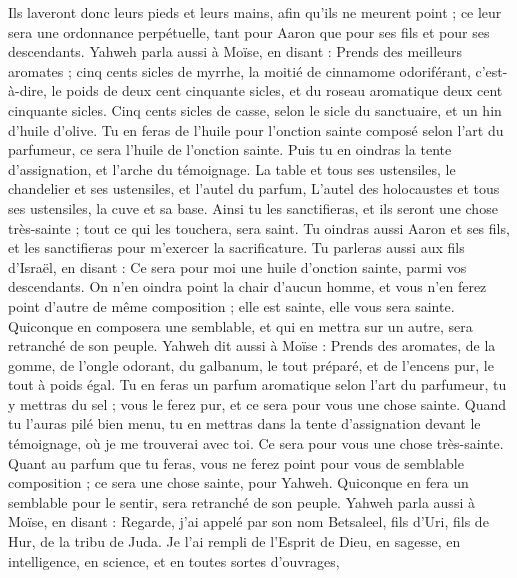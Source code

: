 \begin{multicols}{2}
Ils laveront donc leurs pieds et leurs mains, afin qu'ils ne meurent point ; ce leur sera une ordonnance perpétuelle, tant pour Aaron que pour ses fils et pour ses descendants.
Yahweh parla aussi à Moïse, en disant :
Prends des meilleurs aromates ; cinq cents sicles de myrrhe, la moitié de cinnamome odoriférant, c'est-à-dire, le poids de deux cent cinquante sicles, et du roseau aromatique deux cent cinquante sicles.
Cinq cents sicles de casse, selon le sicle du sanctuaire, et un hin d'huile d'olive.
Tu en feras de l'huile pour l'onction sainte composé selon l’art du parfumeur, ce sera l'huile de l'onction sainte.
Puis tu en oindras la tente d'assignation, et l'arche du témoignage.
La table et tous ses ustensiles, le chandelier et ses ustensiles, et l'autel du parfum,
L'autel des holocaustes et tous ses ustensiles, la cuve et sa base.
Ainsi tu les sanctifieras, et ils seront une chose très-sainte ; tout ce qui les touchera, sera saint.
Tu oindras aussi Aaron et ses fils, et les sanctifieras pour m'exercer la sacrificature.
Tu parleras aussi aux fils d'Israël, en disant : Ce sera pour moi une huile d’onction sainte, parmi vos descendants.
On n'en oindra point la chair d'aucun homme, et vous n'en ferez point d'autre de même composition ; elle est sainte, elle vous sera sainte.
Quiconque en composera une semblable, et qui en mettra sur un autre, sera retranché de son peuple.
Yahweh dit aussi à Moïse : Prends des aromates, de la gomme, de l’ongle odorant, du galbanum, le tout préparé, et de l'encens pur, le tout à poids égal.
Tu en feras un parfum aromatique selon l'art du parfumeur, tu y mettras du sel ; vous le ferez pur, et ce sera pour vous une chose sainte.
Quand tu l'auras pilé bien menu, tu en mettras dans la tente d'assignation devant le témoignage, où je me trouverai avec toi. Ce sera pour vous une chose très-sainte.
Quant au parfum que tu feras, vous ne ferez point pour vous de semblable composition ; ce sera une chose sainte, pour Yahweh.
Quiconque en fera un semblable pour le sentir, sera retranché de son peuple.
\VerseOne{}Yahweh parla aussi à Moïse, en disant :
Regarde, j'ai appelé par son nom Betsaleel, fils d'Uri, fils de Hur, de la tribu de Juda.
Je l'ai rempli de l'Esprit de Dieu, en sagesse, en intelligence, en science, et en toutes sortes d'ouvrages,

\end{multicols}
